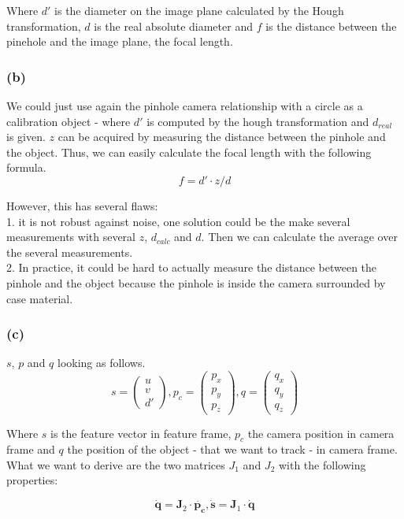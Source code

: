 \documentclass[a4paper,12pt]{article}
\begin{document}
Where $d'$ is the diameter on the image plane calculated by the Hough transformation, $d$ is the real absolute diameter and $f$ is the distance between the pinehole and the image plane, the focal length.

\subsubsection*{(b)}
We could just use again the pinhole camera relationship with a circle as a calibration object - where $d'$ is computed by the hough transformation and $d_{real}$ is given. $z$ can be acquired by measuring the distance between the pinhole and the object. Thus, we can easily calculate the focal length with the following formula.
\[
f = d' \cdot z / d
\]

However, this has several flaws: \\
1. it is not robust against noise, one solution could be the make several measurements with several $z$, $d_{calc}$ and $d$. Then we can calculate the average over the several measurements.\\
2. In practice, it could be hard to actually measure the distance between the pinhole and the object because the pinhole is inside the camera surrounded by case material. \\


\subsubsection*{(c)}
$s$, $p$ and $q$ looking as follows.
\[
s = \begin{pmatrix} u \\ v \\ d' \end{pmatrix},
p_c = \begin{pmatrix} p_x \\ p_y \\ p_z \end{pmatrix},
q = \begin{pmatrix} q_x \\ q_y \\ q_z
\end{pmatrix}
\]

Where $s$ is the feature vector in feature frame, $p_c$ the camera position in camera frame and $q$ the position of the object - that we want to track - in camera frame. What we want to derive are the two matrices $J_1$ and $J_2$ with the following properties:

\[
\dot{\mathbf{q}} = \mathbf{J}_2 \cdot \dot{\mathbf{p_c}}, 
\dot{\mathbf{s}} = \mathbf{J}_1 \cdot \dot{\mathbf{q}}
\]
\end{document}
